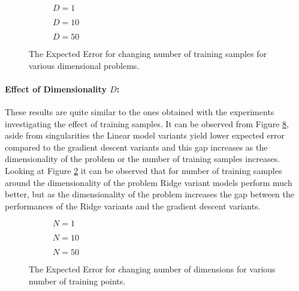 \begin{figure}[!h]
  \centering
    \begin{subfigure}{0.3\textwidth}
      \centering
      \caption{$D=1$}
      \label{fig:linear-N-D-1}
    \end{subfigure}
    \begin{subfigure}{0.3\textwidth}
      \centering
      \caption{$D=10$}
      \label{fig:linear-N-D-10}
    \end{subfigure}
    \begin{subfigure}{0.3\textwidth}
      \centering
      \caption{$D=50$}
      \label{fig:linear-N-D-50}
    \end{subfigure}
  \caption{The Expected Error for changing number of training samples for various dimensional problems.}\label{fig:linear-N}
\end{figure}


\paragraph{Effect of Dimensionality $D$:} These results are quite similar to the ones obtained with the experiments investigating the effect of training samples. It can be observed from Figure \ref{fig:linear-D}, aside from singularities the Linear model variants yield lower expected error compared to the gradient descent variants and this gap increases as the dimensionality of the problem or the number of training samples increases. Looking at Figure \ref{fig:linear-N-D-10} it can be observed that for number of training samples around the dimensionality of the problem Ridge variant models perform much better, but as the dimensionality of the problem increases the gap between the performances of the Ridge variants and the gradient descent variants.

\begin{figure}[!h]
  \centering
    \begin{subfigure}{0.3\textwidth}
      \centering
      \caption{$N=1$}
      \label{fig:linear-D-N-1}
    \end{subfigure}
    \begin{subfigure}{0.3\textwidth}
      \centering
      \caption{$N=10$}
      \label{fig:linear-D-N-10}
    \end{subfigure}
    \begin{subfigure}{0.3\textwidth}
      \centering
      \caption{$N=50$}
      \label{fig:linear-D-N-50}
    \end{subfigure}
  \caption{The Expected Error for changing number of dimensions for various number of training points.}\label{fig:linear-D}
\end{figure}


